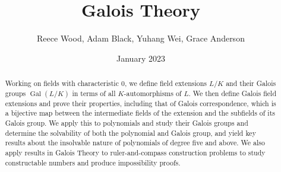 \documentclass{uonmath-mgp}
\title{\textbf{Galois Theory}}
\author{Reece Wood, Adam Black, Yuhang Wei, Grace Anderson}
\date{January 2023}
\theoremstyle{definition}
\newcommand{\Gal}{\operatorname{Gal}}
\begin{document}
\begin{abstract}
    Working on fields with characteristic $0$, we define field extensions $L/K$ and their Galois groups $\Gal(L/K)$ in terms of all $K$-automorphisms of $L$. We then define Galois field extensions and prove their properties, including that of Galois correspondence, which is a bijective map between the intermediate fields of the extension and the subfields of its Galois group. We apply this to polynomials and study their Galois groups and determine the solvability of both the polynomial and Galois group, and yield key results about the insolvable nature of polynomials of degree five and above. We also apply results in Galois Theory to ruler-and-compass construction problems to study constructable numbers and produce impossibility proofs. 
\end{abstract}

\maketitle



\newpage 
{}
\tableofcontents



\newpage
{}










\newpage
{}
\appendix



\newpage
 
\end{document}

